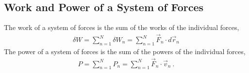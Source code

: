 \documentclass[letterpaper,10pt,english]{jupyterBook}
\begin{document}
\subsection{Work and Power of a System of Forces}
\label{\detokenize{ch/actions-work:work-and-power-of-a-system-of-forces}}
\sphinxAtStartPar
{} The work of a system of forces is the sum of the works of the individual forces,
\begin{equation*}
\begin{split}\delta W = \sum_{n=1}^{N} \delta W_n = \sum_{n=1}^{N} \vec{F}_n \cdot d \vec{r}_n\end{split}
\end{equation*}
\sphinxAtStartPar
{} The power of a system of forces is the sum of the powers of the individual forces,
\begin{equation*}
\begin{split}P = \sum_{n=1}^{N} P_n = \sum_{n=1}^{N} \vec{F}_n \cdot \vec{v}_n \ .\end{split}
\end{equation*}
\end{document}
